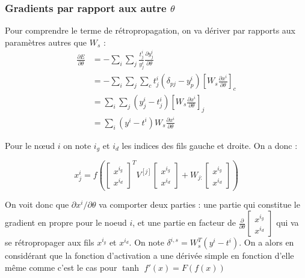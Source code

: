 \documentclass[conference]{IEEEtran}
\begin{document}
\subsubsection{Gradients par rapport aux autre $\theta$}
Pour comprendre le terme de rétropropagation, on va dériver par rapports aux paramètres autres que $W_s$ :
\begin{align*}
\frac{\partial E}{\partial \theta} &= -\sum_i\sum_j \frac{t_j^i}{y_j^i} \frac{\partial y_j^i}{\partial \theta}\\
&=-\sum_i\sum_j \sum_c t_j^i(\delta_{pj}-y_p^i)\left[W_s\frac{\partial{x^i}}{\partial\theta}\right]_c\\
&= \sum_i\sum_j (y_j^i -t_j^i)\left[W_s\frac{\partial{x^i}}{\partial\theta}\right]_j\\
&=\sum_i (y^i-t^i)W_s\frac{\partial{x^i}}{\partial\theta}
\end{align*}

Pour le nœud $i$ on note $i_g$ et $i_d$ les indices des fils gauche et droite. On a donc :

$$x^i_j=f\left( \begin{bmatrix} x^{i_g} \\ x^{i_d} \end{bmatrix}^T V^{[j]}\begin{bmatrix} x^{i_g} \\ x^{i_d} \end{bmatrix} + W_{j:}\begin{bmatrix} x^{i_g} \\ x^{i_d} \end{bmatrix}\right)$$

On voit donc que $\partial x^i / \partial \theta$ va comporter deux parties : une partie qui constitue le gradient en propre pour le noeud $i$, et une partie en facteur de $\frac{\partial}{\partial\theta}\begin{bmatrix} x^{i_g} \\ x^{i_d} \end{bmatrix}$ qui va se rétropropager aux fils $x^{i_g}$ et $x^{i_d}$.
On note $\delta^{i,s}=W_s^T(y^i-t^i)$. On a alors en considérant que la fonction d'activation a une dérivée simple en fonction d'elle même comme c'est le cas pour $\tanh$ $f'(x)=F(f(x))$
\end{document}
